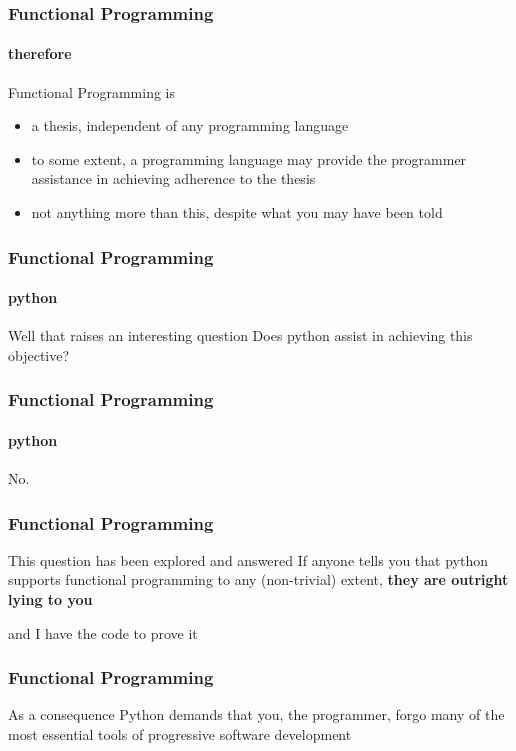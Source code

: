 \begin{frame}
\frametitle{Functional Programming}
\framesubtitle{therefore}
\begin{block}{Functional Programming is}
\begin{itemize}
\item<1> a thesis, independent of any programming language
\item<2> to some extent, a programming language may provide the programmer assistance in achieving adherence to the thesis
\item<3> not anything more than this, despite what you may have been told
\end{itemize}
\end{block}
\end{frame}


\begin{frame}
\frametitle{Functional Programming}
\framesubtitle{python}
\begin{block}{Well that raises an interesting question}
Does python assist in achieving this objective?
\end{block}
\end{frame}


\begin{frame}
\frametitle{Functional Programming}
\framesubtitle{python}
\begin{center}
\huge{No.}
\end{center}
\normalsize
\end{frame}


\begin{frame}
\frametitle{Functional Programming}
\begin{block}{This question has been explored and answered}
If anyone tells you that python supports functional programming to any (non-trivial) extent, \textbf{they are outright lying to you}
\end{block}
\tiny{and I have the code to prove it}
\end{frame}


\begin{frame}
\frametitle{Functional Programming}
\begin{block}{As a consequence}
Python demands that you, the programmer, forgo many of the most essential tools of progressive software development
\end{block}
\end{frame}
